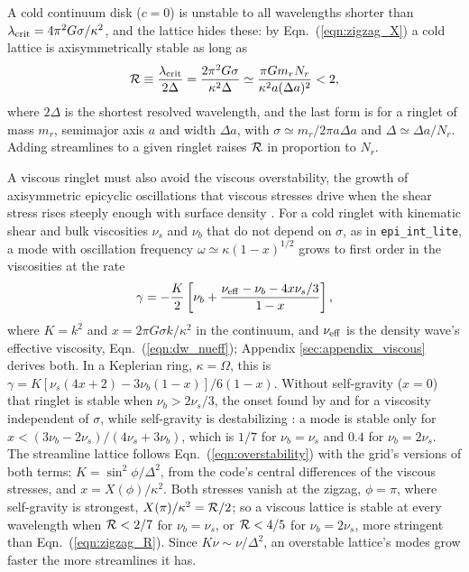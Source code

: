 \documentclass[twocolumn]{aastex702}
\newcommand{\code}[1]{\texttt{#1}}   %
\begin{document}
A cold continuum disk ($c = 0$) is unstable to all wavelengths shorter than
$\lambda_{\rm crit} = 4\pi^2G\sigma/\kappa^2$, and the lattice hides these: by
Eqn.\ (\ref{eqn:zigzag_X}) a cold lattice is axisymmetrically stable as long as
\begin{equation}
    \label{eqn:zigzag_R}
    {\cal R} \equiv \frac{\lambda_{\rm crit}}{2\Delta} = \frac{2\pi^2G\sigma}{\kappa^2\Delta}
    \simeq \frac{\pi G m_r N_r}{\kappa^2a(\Delta a)^2} < 2,
\end{equation}
where $2\Delta$ is the shortest resolved wavelength, and the last form is for a ringlet of mass
$m_r$, semimajor axis $a$ and width $\Delta a$, with $\sigma \simeq m_r/2\pi a\Delta a$ and
$\Delta \simeq \Delta a/N_r$. Adding streamlines to a given ringlet raises ${\cal R}$ in
proportion to $N_r$.

A viscous ringlet must also avoid the viscous overstability, the growth of axisymmetric epicyclic
oscillations that viscous stresses drive when the shear stress rises steeply enough with surface
density \citep{ST95, LR95, SSS01, S01, LO06, LO08}. For a cold ringlet with kinematic shear
and bulk viscosities $\nu_s$ and $\nu_b$ that do not depend on $\sigma$, as in \code{epi\_int\_lite}, a
mode with oscillation frequency $\omega \simeq \kappa(1 - x)^{1/2}$ grows to first order in the
viscosities at the rate
\begin{equation}
    \label{eqn:overstability}
    \gamma = -\frac{K}{2}\left[\nu_b + \frac{\nu_{\rm eff} - \nu_b - 4x\nu_s/3}{1 - x}\right],
\end{equation}
where $K = k^2$ and $x = 2\pi G\sigma k/\kappa^2$ in the continuum, and $\nu_{\rm eff}$ is the density wave's
effective viscosity, Eqn.\ (\ref{eqn:dw_nueff}); Appendix \ref{sec:appendix_viscous} derives both. In a Keplerian
ring, $\kappa = \Omega$, this is $\gamma = K[\nu_s(4x + 2) - 3\nu_b(1 - x)]/6(1 - x)$. Without self-gravity ($x = 0$)
that ringlet is stable when $\nu_b > 2\nu_s/3$, the onset found by \cite{ST95} and \cite{LSS17} for a
viscosity independent of $\sigma$, while self-gravity is destabilizing \citep{LSS17}: a mode is
stable only for $x < (3\nu_b - 2\nu_s)/(4\nu_s + 3\nu_b)$, which is $1/7$ for $\nu_b = \nu_s$ and
$0.4$ for $\nu_b = 2\nu_s$. The streamline lattice follows Eqn.\ (\ref{eqn:overstability}) with the
grid's versions of both terms: $K = \sin^2\phi/\Delta^2$, from the code's central differences of the
viscous stresses, and $x = X(\phi)/\kappa^2$. Both stresses vanish at the zigzag, $\phi = \pi$, where
self-gravity is strongest, $X(\pi)/\kappa^2 = {\cal R}/2$; so a viscous lattice is stable at every
wavelength when ${\cal R} < 2/7$ for $\nu_b = \nu_s$, or ${\cal R} < 4/5$ for $\nu_b = 2\nu_s$, more
stringent than Eqn.\ (\ref{eqn:zigzag_R}). Since $K\nu \sim \nu/\Delta^2$, an overstable lattice's
modes grow faster the more streamlines it has.
\end{document}
